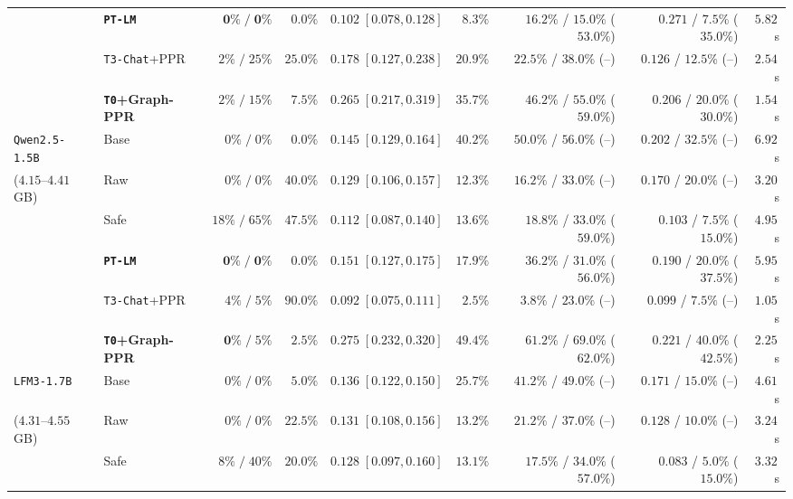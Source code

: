 \documentclass{article}
\begin{document}
\begin{table}[t]
\begin{center}
\begin{tabular}{llrrrrrrr}
 & \textbf{\texttt{PT-LM}} & $\mathbf{0\%\;/\;0\%}$ & $\mathbf{0.0\%}$ & $0.102\;[0.078, 0.128]$ & $8.3\%$ & $16.2\%$ / $15.0\%$ ($53.0\%$) & $\mathbf{0.271}$ / $7.5\%$ ($\mathbf{35.0\%}$) & $5.82$\,s \\
 & \texttt{T3-Chat}+PPR & $2\%\;/\;25\%$ & $25.0\%$ & $0.178\;[0.127, 0.238]$ & $20.9\%$ & $22.5\%$ / $38.0\%$ (--) & $0.126$ / $12.5\%$ (--) & $2.54$\,s \\
 & \textbf{\texttt{T0}+Graph-PPR} & $2\%\;/\;15\%$ & $7.5\%$ & $\mathbf{0.265\;[0.217, 0.319]}$ & $35.7\%$ & $\mathbf{46.2\%}$ / $\mathbf{55.0\%}$ ($\mathbf{59.0\%}$) & $0.206$ / $20.0\%$ ($30.0\%$) & $\mathbf{1.54}$\,s \\
\midrule
\texttt{Qwen2.5-1.5B} & Base & $0\%\;/\;0\%$ & $0.0\%$ & $0.145\;[0.129, 0.164]$ & $40.2\%$ & $50.0\%$ / $56.0\%$ (--) & $0.202$ / $32.5\%$ (--) & $6.92$\,s \\
($4.15$--$4.41$\,GB) & Raw & $0\%\;/\;0\%$ & $40.0\%$ & $0.129\;[0.106, 0.157]$ & $12.3\%$ & $16.2\%$ / $33.0\%$ (--) & $0.170$ / $20.0\%$ (--) & $3.20$\,s \\
 & Safe & $18\%\;/\;65\%$ & $47.5\%$ & $0.112\;[0.087, 0.140]$ & $13.6\%$ & $18.8\%$ / $33.0\%$ ($59.0\%$) & $0.103$ / $7.5\%$ ($15.0\%$) & $4.95$\,s \\
 & \textbf{\texttt{PT-LM}} & $\mathbf{0\%\;/\;0\%}$ & $\mathbf{0.0\%}$ & $0.151\;[0.127, 0.175]$ & $17.9\%$ & $36.2\%$ / $31.0\%$ ($56.0\%$) & $0.190$ / $20.0\%$ ($37.5\%$) & $5.95$\,s \\
 & \texttt{T3-Chat}+PPR & $4\%\;/\;5\%$ & $90.0\%$ & $0.092\;[0.075, 0.111]$ & $2.5\%$ & $3.8\%$ / $23.0\%$ (--) & $0.099$ / $7.5\%$ (--) & $1.05$\,s \\
 & \textbf{\texttt{T0}+Graph-PPR} & $\mathbf{0\%}\;/\;5\%$ & $2.5\%$ & $\mathbf{0.275\;[0.232, 0.320]}$ & $\mathbf{49.4\%}$ & $\mathbf{61.2\%}$ / $\mathbf{69.0\%}$ ($\mathbf{62.0\%}$) & $\mathbf{0.221}$ / $\mathbf{40.0\%}$ ($\mathbf{42.5\%}$) & $\mathbf{2.25}$\,s \\
\midrule
\texttt{LFM3-1.7B} & Base & $0\%\;/\;0\%$ & $5.0\%$ & $0.136\;[0.122, 0.150]$ & $25.7\%$ & $41.2\%$ / $49.0\%$ (--) & $0.171$ / $15.0\%$ (--) & $4.61$\,s \\
($4.31$--$4.55$\,GB) & Raw & $0\%\;/\;0\%$ & $22.5\%$ & $0.131\;[0.108, 0.156]$ & $13.2\%$ & $21.2\%$ / $37.0\%$ (--) & $0.128$ / $10.0\%$ (--) & $3.24$\,s \\
 & Safe & $8\%\;/\;40\%$ & $20.0\%$ & $0.128\;[0.097, 0.160]$ & $13.1\%$ & $17.5\%$ / $34.0\%$ ($57.0\%$) & $0.083$ / $5.0\%$ ($15.0\%$) & $3.32$\,s \\

\end{tabular}
\end{center}
\end{table}
\end{document}
